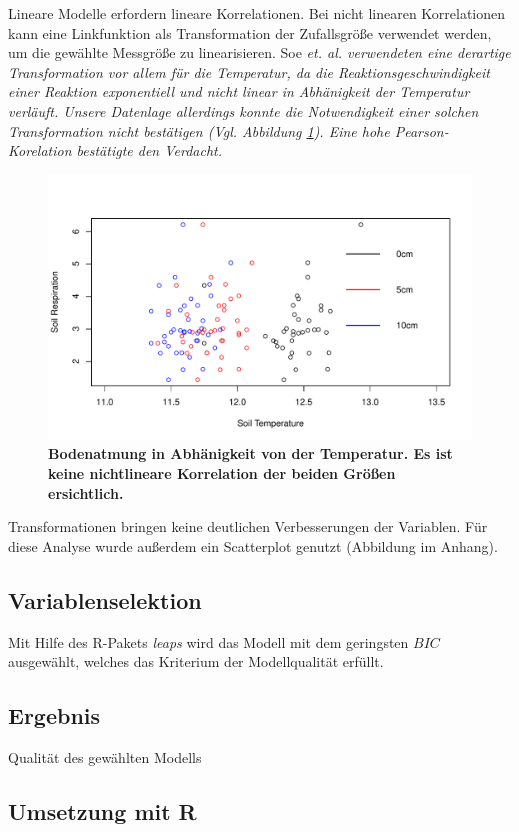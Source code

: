 Lineare Modelle erfordern lineare Korrelationen.
Bei nicht linearen Korrelationen kann eine Linkfunktion als Transformation der Zufallsgröße verwendet werden, um die gewählte Messgröße zu linearisieren.
Soe \it{et. al.} verwendeten eine derartige Transformation vor allem für die Temperatur, da die Reaktionsgeschwindigkeit einer Reaktion exponentiell und nicht linear in Abhänigkeit der Temperatur verläuft.
Unsere Datenlage allerdings konnte die Notwendigkeit einer solchen Transformation nicht bestätigen (Vgl. Abbildung \ref{fig:temp}).
Eine hohe \it{Pearson}-Korelation bestätigte den Verdacht.
\begin{figure}
	\centering
	\includegraphics[width=\textwidth]{fig/model/temp-vs-resp.pdf}
	\caption{\bf{Bodenatmung in Abhänigkeit von der Temperatur.}
		 Es ist keine nichtlineare Korrelation der beiden Größen ersichtlich. }
	\label{fig:temp}
\end{figure}
Transformationen bringen keine deutlichen Verbesserungen der Variablen. 
Für diese Analyse wurde außerdem ein Scatterplot genutzt (Abbildung im Anhang).

\subsection{Variablenselektion}

Mit Hilfe des R-Pakets \emph{leaps} wird das Modell mit dem geringsten $BIC$ ausgewählt, welches das Kriterium der Modellqualität erfüllt.

\subsection{Ergebnis}
Qualität des gewählten Modells

\subsection{Umsetzung mit R}


